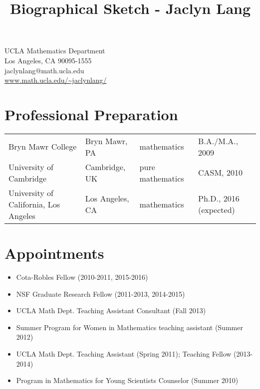 \documentclass[12pt]{amsart}
\title{Biographical Sketch - Jaclyn Lang}
\date{}
\begin{document}
\maketitle

\begin{multicols}{2}
\noindent UCLA Mathematics Department\\
Los Angeles, CA 90095-1555\\
jaclynlang@math.ucla.edu\\
\url{www.math.ucla.edu/~jaclynlang/}
\end{multicols}

\section*{Professional Preparation}
\noindent\begin{tabular}{l l l l}
Bryn Mawr College & Bryn Mawr, PA & mathematics & B.A./M.A., 2009\\
University of Cambridge & Cambridge, UK & pure mathematics & CASM, 2010\\
University of California, Los Angeles & Los Angeles, CA & mathematics & Ph.D., 2016 (expected)
\end{tabular}

\section*{Appointments}
\begin{itemize}
\item Cota-Robles Fellow (2010-2011, 2015-2016)
\item NSF Graduate Research Fellow (2011-2013, 2014-2015)
\item UCLA Math Dept. Teaching Assistant Consultant (Fall 2013)
\item Summer Program for Women in Mathematics teaching assistant (Summer 2012)
\item UCLA Math Dept. Teaching Assistant (Spring 2011); Teaching Fellow (2013-2014)
\item Program in Mathematics for Young Scientists Counselor (Summer 2010)
\end{itemize}
\end{document}
